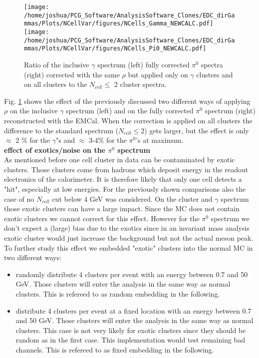 \documentclass[ALICE]{ALICE_analysis_notes}
\begin{document}
\begin{figure}[h!]
	\centering
	\texttt{[image: /home/joshua/PCG\_Software/AnalysisSoftware\_Clones/EDC\_dirGammas/Plots/NCellVar/figures/NCells\_Gamma\_NEWCALC.pdf]}
	\texttt{[image: /home/joshua/PCG\_Software/AnalysisSoftware\_Clones/EDC\_dirGammas/Plots/NCellVar/figures/NCells\_Pi0\_NEWCALC.pdf]}
	\caption{Ratio of the inclusive $\gamma$ spectrum (left) fully corrected $\pi^{0}$ spectra (right) corrected with the same $\rho$ but applied only on $\gamma$ clusters and on all clusters to the $N_{cell} \leq$ 2 cluster spectra.}
	\label{fig:NCells_Pi0Spec_diffMethods}
\end{figure}
Fig. \ref{fig:NCells_Pi0Spec_diffMethods} shows the effect of the previously discussed two different ways of applying $\rho$ on the inclusive $\gamma$ spectrum (left) and on the fully corrected $\pi^{0}$ spectrum (right) reconstructed with the EMCal. When the correction is applied on all clusters the difference to the standard spectrum ($N_{cell} \leq 2$) gets larger, but the effect is only $\approx$ 2 \% for the $\gamma$"s and $\approx$ 3-4\% for the $\pi^{0}$'s  at maximum.\\


\textbf{effect of exotics/noise on the $\pi^{0}$ spectrum}\\
As mentioned before one cell cluster in data can be contaminated by exotic clusters. Those clusters come from hadrons which deposit energy in the readout electronics of the calorimeter. It is therefore likely that only one cell detects a "hit", especially at low energies. For the previously shown comparisons also the case of no $N_{cell}$ cut below 4 GeV was considered. On the cluster and $\gamma$ spectrum those exotic clusters can have a large impact. Since the MC does not contain exotic clusters we cannot correct for this effect. However for the $\pi^{0}$ spectrum we don't expect a (large) bias due to the exotics since in an invariant mass analysis exotic cluster would just increase the background but not the actual meson peak. To further study this effect we embedded "exotic" clusters into the normal MC in two different ways:
\begin{itemize}
	\item randomly distribute 4 clusters per event with an energy between 0.7 and 50 GeV. Those clusters will enter the analysis in the same way as normal clusters. This is refereed to as random embedding in the following.
	\item distribute 4 clusters per event at a fixed location with an energy between 0.7 and 50 GeV. Those clusters will enter the analysis in the same way as normal clusters. This case is not very likely for exotic clusters since they should be random as in the first case. This implementation would test remaining bad channels. This is refereed to as fixed embedding in the following.
\end{itemize}
\end{document}

